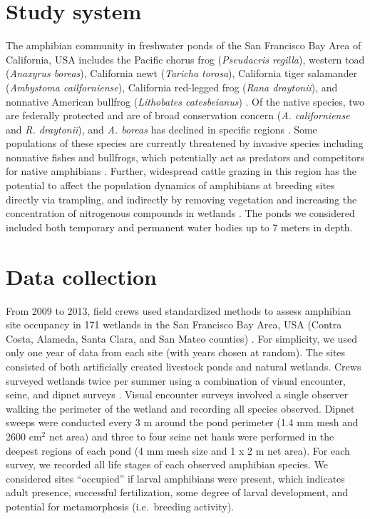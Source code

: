 \section{Study system}

The amphibian community in freshwater ponds of the San Francisco Bay
Area of California, USA includes the Pacific chorus frog
(\textit{Pseudacris regilla}), western toad (\textit{Anaxyrus boreas}),
California newt (\textit{Taricha torosa}), California tiger salamander
(\textit{Ambystoma cailforniense}), California red-legged frog (\textit{Rana
draytonii}), and nonnative American bullfrog (\textit{Lithobates
catesbeianus}) \citep{stebbins2003}. Of the native species, two are federally
protected and are of broad conservation concern (\textit{A. californiense}
and \textit{R. draytonii}), and \textit{A. boreas} has declined in specific
regions \citep{lannoo2005}. Some populations of these species are currently
threatened by invasive species including nonnative fishes and bullfrogs,
which potentially act as predators and competitors for native amphibians
\citep{Fisher1996, lawler1999, Preston2012}.
Further, widespread cattle grazing in this region has the potential to
affect the population dynamics of amphibians at breeding sites directly
via trampling, and indirectly by removing vegetation and increasing the
concentration of nitrogenous compounds in wetlands \citep{Robins2002, Roche2012}.
The ponds we considered included both
temporary and permanent water bodies up to 7 meters in depth.

\section{Data collection}

From 2009 to 2013, field crews used standardized methods to assess
amphibian site occupancy in 171 wetlands in the San Francisco Bay Area,
USA (Contra Costa, Alameda, Santa Clara, and San Mateo counties) \citep{Johnson2013}.
For simplicity, we used only one year of data
from each site (with years chosen at random). The sites consisted of
both artificially created livestock ponds and natural wetlands. Crews
surveyed wetlands twice per summer using a combination of visual
encounter, seine, and dipnet surveys \citep{Crump1994}. Visual
encounter surveys involved a single observer walking the perimeter of
the wetland and recording all species observed. Dipnet sweeps were
conducted every 3 m around the pond perimeter (1.4 mm mesh and 2600
cm$^2$ net area) and three to four seine net hauls were performed in the
deepest regions of each pond (4 mm mesh size and 1 x 2 m net area). For
each survey, we recorded all life stages of each observed amphibian
species. We considered sites ``occupied'' if larval amphibians were
present, which indicates adult presence, successful fertilization, some
degree of larval development, and potential for metamorphosis
(i.e.~breeding activity).

